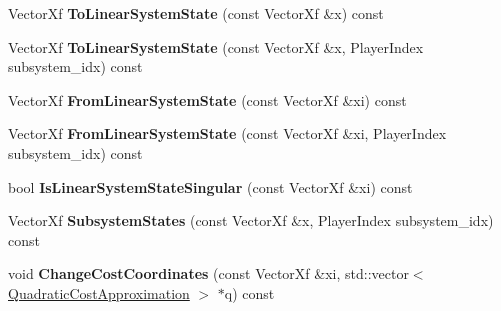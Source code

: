 \begin{DoxyCompactItemize}
\item 
Vector\+Xf {\bfseries To\+Linear\+System\+State} (const Vector\+Xf \&x) const \hypertarget{classilqgames_1_1_concatenated_flat_system_a032bc555367ecd4122ec5968962cfff5}{}\label{classilqgames_1_1_concatenated_flat_system_a032bc555367ecd4122ec5968962cfff5}

\item 
Vector\+Xf {\bfseries To\+Linear\+System\+State} (const Vector\+Xf \&x, Player\+Index subsystem\+\_\+idx) const \hypertarget{classilqgames_1_1_concatenated_flat_system_ada597e4306beabae2d83f68ded70823f}{}\label{classilqgames_1_1_concatenated_flat_system_ada597e4306beabae2d83f68ded70823f}

\item 
Vector\+Xf {\bfseries From\+Linear\+System\+State} (const Vector\+Xf \&xi) const \hypertarget{classilqgames_1_1_concatenated_flat_system_aab7969ca5f64a1b670e075aabc32e621}{}\label{classilqgames_1_1_concatenated_flat_system_aab7969ca5f64a1b670e075aabc32e621}

\item 
Vector\+Xf {\bfseries From\+Linear\+System\+State} (const Vector\+Xf \&xi, Player\+Index subsystem\+\_\+idx) const \hypertarget{classilqgames_1_1_concatenated_flat_system_a330952bb97f5cef2130f2166ad6daab6}{}\label{classilqgames_1_1_concatenated_flat_system_a330952bb97f5cef2130f2166ad6daab6}

\item 
bool {\bfseries Is\+Linear\+System\+State\+Singular} (const Vector\+Xf \&xi) const \hypertarget{classilqgames_1_1_concatenated_flat_system_abc379d1ab97515b32e6b5e2e6ec5cf69}{}\label{classilqgames_1_1_concatenated_flat_system_abc379d1ab97515b32e6b5e2e6ec5cf69}

\item 
Vector\+Xf {\bfseries Subsystem\+States} (const Vector\+Xf \&x, Player\+Index subsystem\+\_\+idx) const \hypertarget{classilqgames_1_1_concatenated_flat_system_af1ee81770be11dd9f301c0b2b7f608c0}{}\label{classilqgames_1_1_concatenated_flat_system_af1ee81770be11dd9f301c0b2b7f608c0}

\item 
void {\bfseries Change\+Cost\+Coordinates} (const Vector\+Xf \&xi, std\+::vector$<$ \hyperlink{structilqgames_1_1_quadratic_cost_approximation}{Quadratic\+Cost\+Approximation} $>$ $\ast$q) const \hypertarget{classilqgames_1_1_concatenated_flat_system_a79b8c2249adef578e42cfd92224a45ee}{}\label{classilqgames_1_1_concatenated_flat_system_a79b8c2249adef578e42cfd92224a45ee}


\end{DoxyCompactItemize}
